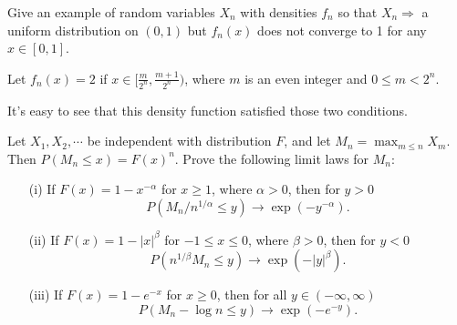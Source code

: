 \documentclass[en, normal, 12pt, black]{elegantnote}
\newenvironment{exercise}[1]{\begin{tcolorbox}[colback=black!15, colframe=black!80, breakable, title=#1]}{\end{tcolorbox}}
\newenvironment{solution}{\begin{tcolorbox}[colback=white, colframe=black!50, breakable, title=Solution. ]\setlength{\parskip}{0.8em}}{\end{tcolorbox}}
\begin{document}



    \begin{exercise}{3.2.1}
        Give an example of random variables $X_{n}$ with densities $f_{n}$ so that $X_{n} \Rightarrow$ a uniform distribution on $(0,1)$ but $f_{n}(x)$ does not converge to 1 for any $x \in[0,1]$. 
    \end{exercise}

    \begin{solution}
        Let $f_n(x) = 2$ if $x \in [\frac{m}{2^n},\frac{m+1}{2^n})$, where $m$ is an even integer and $0 \leqslant m < 2^n$. 

        It's easy to see that this density function satisfied those two conditions. 
    \end{solution}

    \begin{exercise}{3.2.2. Convergence of maxima}
        Let $X_{1}, X_{2}, \cdots$ be independent with distribution $F$, and let $M_{n}=\max _{m \leqslant n} X_{m} .$ Then $P\left(M_{n} \leqslant x\right)=F(x)^{n}$. Prove the following limit laws for $M_{n}$: 
        \begin{itemize}
            \item[(i)] If $F(x)=1-x^{-\alpha}$ for $x \geqslant 1$, where $\alpha>0$, then for $y>0$
            \[
            P\left(M_{n} / n^{1 / \alpha} \leqslant y\right) \rightarrow \exp \left(-y^{-\alpha}\right). 
            \]
            \item[(ii)] If $F(x)=1-|x|^{\beta}$ for $-1 \leqslant x \leqslant 0$, where $\beta>0$, then for $y<0$
            \[
                P\left(n^{1 / \beta} M_{n} \leqslant y\right) \rightarrow \exp \left(-|y|^{\beta}\right). 
            \]
            \item[(iii)] If $F(x)=1-e^{-x}$ for $x \geqslant 0$, then for all $y \in(-\infty, \infty)$
            \[
                P\left(M_{n}-\log n \leqslant y\right) \rightarrow \exp \left(-e^{-y}\right). 
            \]
        \end{itemize}
    \end{exercise}
\end{document}
